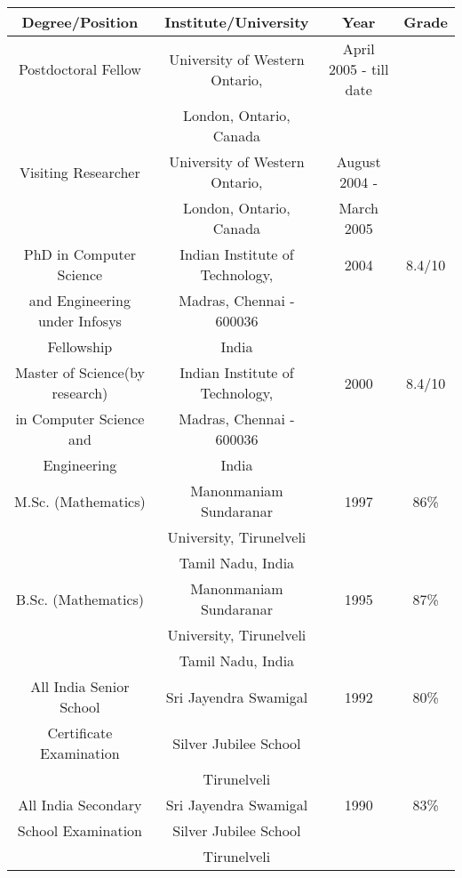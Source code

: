 \documentclass[11pt]{article}
\begin{document}
 \ \\\\
\begin{tabular}{|c|c|c|c|} \hline
Degree/Position & Institute/University & Year & Grade \\ \hline
Postdoctoral Fellow & University of Western Ontario,& April 2005 - till date & \\
& London, Ontario, Canada & & \\ \hline
Visiting Researcher & University of Western Ontario,& August 2004 -  & \\
& London, Ontario, Canada & March 2005 & \\ \hline
PhD in Computer Science & Indian Institute of Technology,& 2004 & 8.4/10 \\
and Engineering under Infosys & Madras, Chennai - 600036 &  & \\
Fellowship & India & &\\ \hline
Master of Science(by research)& Indian Institute of Technology,& 2000
& 8.4/10 \\
in Computer Science and & Madras, Chennai - 600036 & & \\
Engineering & India & & \\ \hline
M.Sc. (Mathematics)& Manonmaniam Sundaranar & 1997 & 86\% \\
& University, Tirunelveli & & \\ 
& Tamil Nadu, India & & \\ \hline
B.Sc. (Mathematics)& Manonmaniam Sundaranar & 1995 & 87\% \\
& University, Tirunelveli & & \\ 
& Tamil Nadu, India & & \\ \hline
All India Senior School & Sri Jayendra Swamigal &  1992 & 80\% \\
Certificate Examination & Silver Jubilee School & & \\
& Tirunelveli & & \\ \hline
All India Secondary & Sri Jayendra Swamigal &  1990 & 83\% \\
School Examination & Silver Jubilee School & & \\
& Tirunelveli & & \\ \hline
\end{tabular}

\vspace{0.5cm}
 
\end{document}
